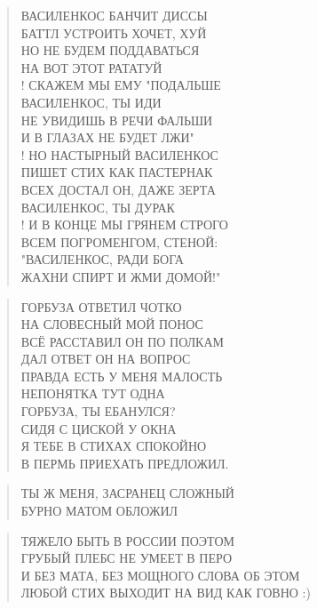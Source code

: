 \poemtitle{***}
\begin{verse}
ВАСИЛЕНКОС БАНЧИТ ДИССЫ\\
БАТТЛ УСТРОИТЬ ХОЧЕТ, ХУЙ\\
НО НЕ БУДЕМ ПОДДАВАТЬСЯ\\
НА ВОТ ЭТОТ РАТАТУЙ\\!
СКАЖЕМ МЫ ЕМУ "ПОДАЛЬШЕ\\
ВАСИЛЕНКОС, ТЫ ИДИ\\
НЕ УВИДИШЬ В РЕЧИ ФАЛЬШИ\\
И В ГЛАЗАХ НЕ БУДЕТ ЛЖИ"\\!
НО НАСТЫРНЫЙ ВАСИЛЕНКОС\\
ПИШЕТ СТИХ КАК ПАСТЕРНАК\\
ВСЕХ ДОСТАЛ ОН, ДАЖЕ ЗЕРТА\\
ВАСИЛЕНКОС, ТЫ ДУРАК\\!
И В КОНЦЕ МЫ ГРЯНЕМ СТРОГО\\
ВСЕМ ПОГРОМЕНГОМ, СТЕНОЙ:\\
"ВАСИЛЕНКОС, РАДИ БОГА\\
ЖАХНИ СПИРТ И ЖМИ ДОМОЙ!"
\end{verse}

\poemtitle{***}
\begin{verse}
ГОРБУЗА ОТВЕТИЛ ЧОТКО\\
НА СЛОВЕСНЫЙ МОЙ ПОНОС\\
ВСЁ РАССТАВИЛ ОН ПО ПОЛКАМ\\
ДАЛ ОТВЕТ ОН НА ВОПРОС\\
ПРАВДА ЕСТЬ У МЕНЯ МАЛОСТЬ\\
НЕПОНЯТКА ТУТ ОДНА\\
ГОРБУЗА, ТЫ ЕБАНУЛСЯ?\\
СИДЯ С ЦИСКОЙ У ОКНА\\
Я ТЕБЕ В СТИХАХ СПОКОЙНО\\
В ПЕРМЬ ПРИЕХАТЬ ПРЕДЛОЖИЛ.
\end{verse}

\poemtitle{***}
\begin{verse}
ТЫ Ж МЕНЯ, ЗАСРАНЕЦ СЛОЖНЫЙ\\
БУРНО МАТОМ ОБЛОЖИЛ
\end{verse}

\poemtitle{***}
\begin{verse}
ТЯЖЕЛО БЫТЬ В РОССИИ ПОЭТОМ\\
ГРУБЫЙ ПЛЕБС НЕ УМЕЕТ В ПЕРО\\
И БЕЗ МАТА, БЕЗ МОЩНОГО СЛОВА ОБ ЭТОМ\\
ЛЮБОЙ СТИХ ВЫХОДИТ НА ВИД КАК ГОВНО :)
\end{verse}

